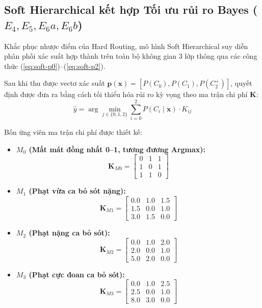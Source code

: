 \subsection{Soft Hierarchical kết hợp Tối ưu rủi ro Bayes ($E_4, E_5, E_6a, E_6b$)}
Khắc phục nhược điểm của Hard Routing, mô hình Soft Hierarchical suy diễn phân phối xác suất hợp thành trên toàn bộ không gian 3 lớp thông qua các công thức (\ref{eq:soft-p0})--(\ref{eq:soft-p2}).

Sau khi thu được vectơ xác suất $\mathbf{p}(\mathbf{x}) = [P(C_0), P(C_1), P(C_2^+)]$, quyết định được đưa ra bằng cách tối thiểu hóa rủi ro kỳ vọng theo ma trận chi phí $\mathbf{K}$:
\begin{equation}
    \hat{y} = \arg\min_{j \in \{0, 1, 2\}} \sum_{i=0}^2 P(C_i \mid \mathbf{x}) \cdot K_{ij}
\end{equation}

Bốn ứng viên ma trận chi phí được thiết kế:
\begin{itemize}
    \item \textbf{$M_0$ (Mất mát đồng nhất 0--1, tương đương Argmax):}
    \begin{equation}
        \mathbf{K}_{M0} = \begin{bmatrix} 0 & 1 & 1 \\ 1 & 0 & 1 \\ 1 & 1 & 0 \end{bmatrix}
    \end{equation}
    \item \textbf{$M_1$ (Phạt vừa ca bỏ sót nặng):}
    \begin{equation}
        \mathbf{K}_{M1} = \begin{bmatrix} 0.0 & 1.0 & 1.5 \\ 1.5 & 0.0 & 1.0 \\ 3.0 & 1.5 & 0.0 \end{bmatrix}
    \end{equation}
    \item \textbf{$M_2$ (Phạt nặng ca bỏ sót):}
    \begin{equation}
        \mathbf{K}_{M2} = \begin{bmatrix} 0.0 & 1.0 & 2.0 \\ 2.0 & 0.0 & 1.0 \\ 5.0 & 2.0 & 0.0 \end{bmatrix}
    \end{equation}
    \item \textbf{$M_3$ (Phạt cực đoan ca bỏ sót):}
    \begin{equation}
        \mathbf{K}_{M3} = \begin{bmatrix} 0.0 & 1.0 & 2.5 \\ 2.5 & 0.0 & 1.0 \\ 8.0 & 3.0 & 0.0 \end{bmatrix}
    \end{equation}
\end{itemize}

